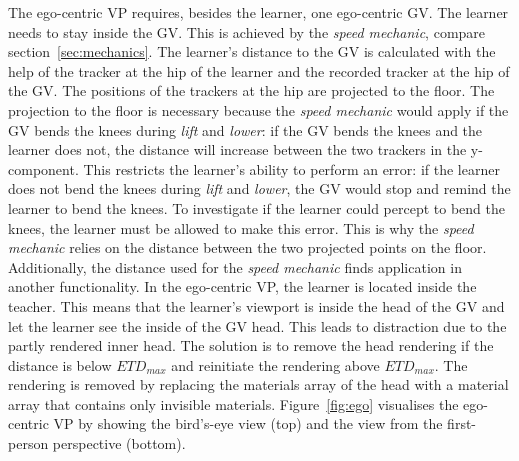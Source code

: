 The ego-centric VP requires, besides the learner, one ego-centric GV. The learner needs to stay inside the GV. This is achieved by the \textit{speed mechanic}, compare section~\ref{sec:mechanics}. The learner's distance to the GV is calculated with the help of the tracker at the hip of the learner and the recorded tracker at the hip of the GV. The positions of the trackers at the hip are projected to the floor. The projection to the floor is necessary because the \textit{speed mechanic} would apply if the GV bends the knees during \textit{lift} and \textit{lower}: if the GV bends the knees and the learner does not, the distance will increase between the two trackers in the y-component. This restricts the learner's ability to perform an error: if the learner does not bend the knees during \textit{lift} and \textit{lower}, the GV would stop and remind the learner to bend the knees. To investigate if the learner could percept to bend the knees, the learner must be allowed to make this error. This is why the \textit{speed mechanic} relies on the distance between the two projected points on the floor.\\
Additionally, the distance used for the \textit{speed mechanic} finds application in another functionality. In the ego-centric VP, the learner is located inside the teacher. This means that the learner's viewport is inside the head of the GV and let the learner see the inside of the GV head. This leads to distraction due to the partly rendered inner head. The solution is to remove the head rendering if the distance is below $ETD_{max}$ and reinitiate the rendering above $ETD_{max}$. The rendering is removed by replacing the materials array of the head with a material array that contains only invisible materials. Figure~\ref{fig:ego} visualises the ego-centric VP by showing the bird's-eye view (top) and the view from the first-person perspective (bottom).\\

